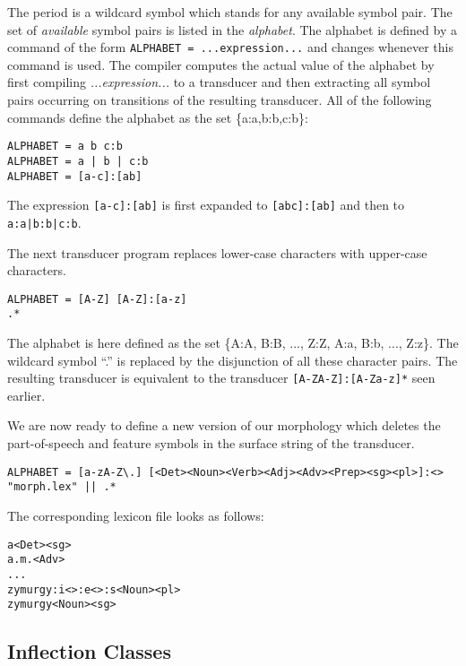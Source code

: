 \documentclass[11pt]{article}
\begin{document}
The period is a wildcard symbol which stands for any available symbol
pair. The set of \emph{available} symbol pairs is listed in the
\emph{alphabet}. The alphabet is defined by a command of the form
\verb#ALPHABET = ...expression...# and changes whenever this command
is used. The compiler computes the actual value of the alphabet by
first compiling \emph{...expression...} to a transducer and then
extracting all symbol pairs occurring on transitions of the resulting
transducer. All of the following commands define the alphabet as the
set \{a:a,b:b,c:b\}:

\begin{verbatim}
ALPHABET = a b c:b
ALPHABET = a | b | c:b
ALPHABET = [a-c]:[ab]
\end{verbatim}

The expression \verb#[a-c]:[ab]# is first expanded to
\verb#[abc]:[ab]# and then to \verb#a:a|b:b|c:b#.

The next transducer program replaces lower-case characters with
upper-case characters.

\begin{verbatim}
ALPHABET = [A-Z] [A-Z]:[a-z]
.*
\end{verbatim}

The alphabet is here defined as the set \{A:A, B:B, ..., Z:Z, A:a,
B:b, ..., Z:z\}. The wildcard symbol ``.'' is replaced by the
disjunction of all these character pairs. The resulting transducer is
equivalent to the transducer \verb#[A-ZA-Z]:[A-Za-z]*#  seen earlier.

We are now ready to define a new version of our morphology which
deletes the part-of-speech and feature symbols in the surface string
of the transducer.

\begin{verbatim}
ALPHABET = [a-zA-Z\.] [<Det><Noun><Verb><Adj><Adv><Prep><sg><pl>]:<>
"morph.lex" || .*
\end{verbatim}

The corresponding lexicon file looks as follows:

\begin{verbatim}
a<Det><sg>
a.m.<Adv>
...
zymurgy:i<>:e<>:s<Noun><pl>
zymurgy<Noun><sg>
\end{verbatim}



\subsection{Inflection Classes}
\end{document}
